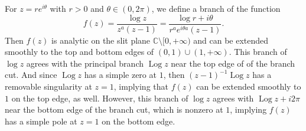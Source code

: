 \documentclass[12pt]{article}
\theoremstyle{definition}
\newcommand{\C}{\mathbb{C}}
\newcommand{\Log}{\operatorname{Log}}
\begin{document}
For $z = re^{i\theta}$ with $r > 0$ and $\theta \in (0, 2\pi)$, we define a branch of the function
\[
    f(z)
        = \frac{\log z}{z^a(z - 1)}
        = \frac{\log r + i\theta}{r^ae^{i\theta a}(z - 1)}.
\]
Then $f(z)$ is analytic on the slit plane $\C \setminus [0, +\infty)$ and can be extended smoothly to the top and bottom edges of $(0, 1) \cup (1, +\infty)$. This branch of $\log z$ agrees with the principal branch $\Log z$ near the top edge of of the branch cut. And since $\Log z$ has a simple zero at $1$, then $(z - 1)^{-1}\Log z$ has a removable singularity at $z = 1$, implying that $f(z)$ can be extended smoothly to $1$ on the top edge, as well. However, this branch of $\log z$ agrees with $\Log z + i2\pi$ near the bottom edge of the branch cut, which is nonzero at $1$, implying $f(z)$ has a simple pole at $z = 1$ on the bottom edge.
\end{document}
